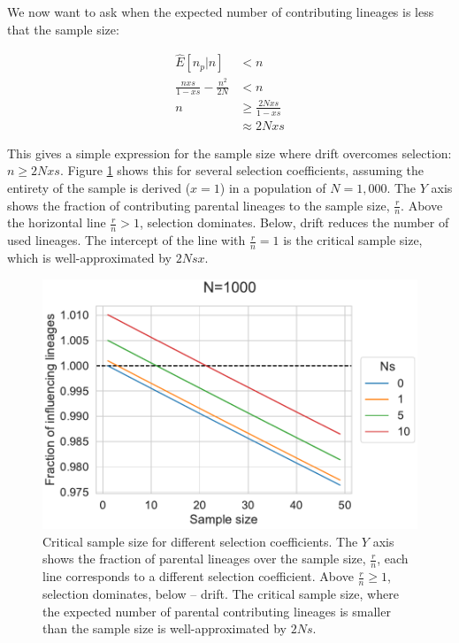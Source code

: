 \documentclass[review]{elsarticle}
\begin{document}
We now want to ask when the expected number of contributing lineages is less that the sample size:

\begin{equation*}
  \begin{align}
    \label{eq:critical-sample}
    \hat{E}[n_p | n] &< n \\
    \frac{nxs}{1-xs} - \frac{n^2}{2N} &< n \\
    n &\ge \frac{2Nxs}{1-xs} \\
                                       &\approx 2Nxs
  \end{align}
\end{equation*}

This gives a simple expression for the sample size where drift overcomes selection: $n \ge 2Nxs$.
Figure \ref{fig:critical-sample-size} shows this for several selection coefficients, assuming the
entirety of the sample is derived ($x=1$) in a population of $N=1,000$. The $Y$ axis shows the fraction of
contributing parental lineages to the sample size, $\frac{r}{n}$. Above the horizontal line
$\frac{r}{n} > 1$, selection dominates. Below, drift reduces the number of used lineages. The
intercept of the line with $\frac{r}{n} = 1$ is the critical sample size, which is well-approximated
by $2Nsx$.

\begin{figure}
  \centering
  \includegraphics{fig/critical_sample_size.pdf}
  \caption{Critical sample size for different selection coefficients. The $Y$ axis shows the
    fraction of parental lineages over the sample size, $\frac{r}{n}$, each line corresponds to a
    different selection coefficient. Above $\frac{r}{n}\ge 1$, selection dominates, below -- drift.
    The critical sample size, where the expected number of parental contributing lineages is smaller
    than the sample size is well-approximated by $2Ns$.}
  \label{fig:critical-sample-size}
\end{figure}
\end{document}
